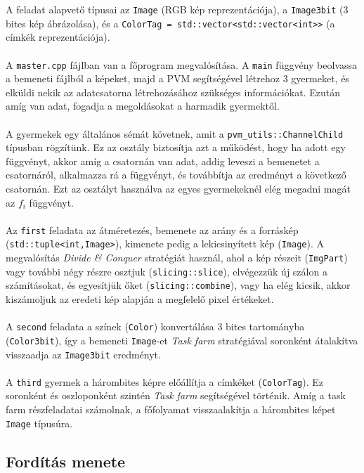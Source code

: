 \documentclass[12pt]{article}
\begin{document}
A feladat alapvető típusai az \verb|Image| (RGB kép reprezentációja), a \verb|Image3bit| (3 bites kép ábrázolása),
és a \verb|ColorTag = std::vector<std::vector<int>>| (a címkék reprezentációja). \\
\\
A \verb|master.cpp| fájlban van a főprogram megvalósítása. A \verb|main| függvény beolvassa a bemeneti fájlból a képeket,
majd a PVM segítségével létrehoz 3 gyermeket, és elküldi nekik az adatcsatorna létrehozásához szükséges információkat.
Ezután amíg van adat, fogadja a megoldásokat a harmadik gyermektől. \\
\\
A gyermekek egy általános sémát követnek, amit a \verb|pvm_utils::ChannelChild| típusban rögzítünk. Ez az osztály biztosítja azt a működést,
hogy ha adott egy függvényt, akkor amíg a csatornán van adat, addig leveszi a bemenetet a csatornáról, alkalmazza rá a függvényt, és
továbbítja az eredményt a következő csatornán. Ezt az osztályt használva az egyes gyermekeknél elég megadni magát az $ f_i $ függvényt. \\
\\
Az \verb|first| feladata az átméretezés, bemenete az arány és a forráskép \\ (\verb|std::tuple<int,Image>|), kimenete pedig a lekicsinyített kép (\verb|Image|). A megvalósítás \textit{Divide \& Conquer} stratégiát használ, ahol a kép részeit (\verb|ImgPart|) vagy további négy részre osztjuk (\verb|slicing::slice|), elvégezzük új szálon a számításokat, és egyesítjük őket (\verb|slicing::combine|), vagy ha elég kicsik, akkor kiszámoljuk az eredeti kép alapján a megfelelő pixel értékeket. \\
\\
A \verb|second| feladata a színek (\verb|Color|) konvertálása 3 bites tartományba (\verb|Color3bit|), így a bemeneti \verb|Image|-et \textit{Task farm} stratégiával soronként átalakítva visszaadja az \verb|Image3bit| eredményt. \\
\\
A \verb|third| gyermek a hárombites képre előállítja a címkéket (\verb|ColorTag|). Ez soronként és oszloponként szintén \textit{Task farm} segítségével történik. Amíg a task farm részfeladatai számolnak, a főfolyamat visszaalakítja a hárombites képet \verb|Image| típusúra.

\subsection{Fordítás menete}
\end{document}
